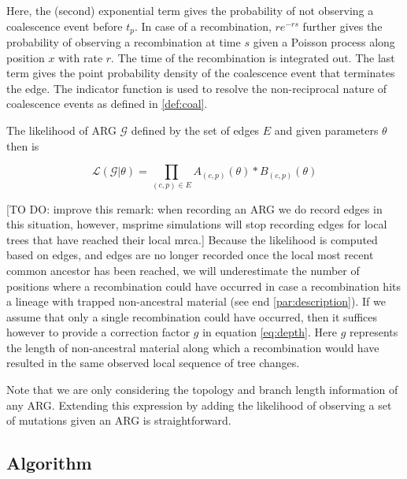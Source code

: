 \documentclass{article}
\begin{document}
Here, the (second) exponential term gives the probability of not observing a
coalescence event before $t_p$. In case of a recombination, $re^{-rs}$ further
gives the probability of observing a recombination
at time $s$ given a Poisson process along position $x$ with rate $r$. The
time of the recombination is integrated out.
The last term gives the point probability density of the coalescence event
that terminates the edge. The indicator function is used to resolve
the non-reciprocal nature of coalescence events as defined in \ref{def:coal}.

The likelihood of ARG $\mathcal{G}$ defined by the set of edges $E$ and
given parameters $\theta$ then is

\begin{equation}\label{eq:full-lik}
\mathcal{L}(\mathcal{G}|\theta) = \prod_{(c, p) \in E} A_{(c, p)}(\theta) * B_{(c, p)}(\theta)
\end{equation}


[TO DO: improve this remark: when recording an ARG we do record edges in this situation,
however, msprime simulations will stop recording edges for local trees that have reached
their local mrca.]
Because the likelihood is computed based on edges,
and edges are no longer recorded once the local most recent common ancestor
has been reached, we will underestimate the number of positions where
a recombination could have occurred in case a recombination hits a
lineage with trapped non-ancestral material (see end \ref{par:description}).
If we assume that only a single recombination could have
occurred, then it suffices however to provide a correction factor $g$ in equation
\ref{eq:depth}. Here $g$ represents the
length of non-ancestral material along which a recombination would have resulted
in the same observed local sequence of tree changes.

Note that we are only considering the topology and branch length information of any ARG.
Extending this expression by adding the likelihood of observing a set of mutations
given an ARG is straightforward.


\subsection{Algorithm} \label{par:algo}
\end{document}
